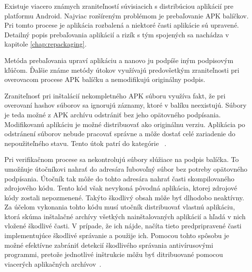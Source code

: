 Existuje viacero známych zraniteľností súvisiacich s distribúciou aplikácií  pre platformu Android. Najviac rozšíreným problémom je prebaľovanie APK balíčkov. Pri tomto procese je aplikácia rozbalená a niektoré časti aplikácie sú upravené. Detailný popis prebaľovania aplikácií a rizík s tým spojených sa nachádza v kapitole \ref{chap:repackaging}.

Metóda prebaľovania upraví aplikáciu a nanovo ju podpíše iným podpisovým kľúčom. Ďalšie známe metódy útokov využívajú predovšetkým zraniteľnosti pri overovacom procese APK balíčku a nemodifikujú originálny podpis. 

Zraniteľnosť pri inštalácií nekompletného APK súboru využíva fakt, že pri overovaní hashov súborov sa ignorujú záznamy, ktoré v balíku neexistujú. Súbory je teda možné z APK archívu odstrániť bez jeho opätovného podpísania. Modifikovanú aplikáciu je možné distribuovať ako originálnu verziu. Aplikácia po odstránení súborov nebude pracovať správne a môže dostať celé zariadenie do nepoužiteľného stavu. Tento útok patrí do kategórie ~\cite{A7idcou1z6WqKvQZ}.

Pri verifikačnom procese sa nekontrolujú súbory slúžiace na podpis balíčka. To umožňuje útočníkovi nahrať do adresára  ľubovoľný súbor bez potreby opätovného podpísania. Útočník tak môže do tohto adresára nahrať časti skompilovaného zdrojového kódu. Tento kód však nevykoná pôvodná aplikácia, ktorej zdrojové kódy zostali nepozmenené. Takýto škodlivý obsah môže byť dlhodobo neaktívny. Za účelom vykonania tohto kódu musí utočník distribuovať vlastnú aplikáciu, ktorá skúma inštalačné archívy všetkých nainštalovaných aplikácií a hľadá v nich vložené škodlivé časti. V prípade, že ich nájde, načíta tieto predpripravené časti implementujúce škodlivé správanie a použije ich. Pomocou tohto spôsobu je možné efektívne zabrániť detekcií škodlivého správania antivírusovými programmi, pretože jednotlivé inštrukcie môžu byť ditribuované pomocou viacerých aplikačných archívov~\cite{A7idcou1z6WqKvQZ}.
